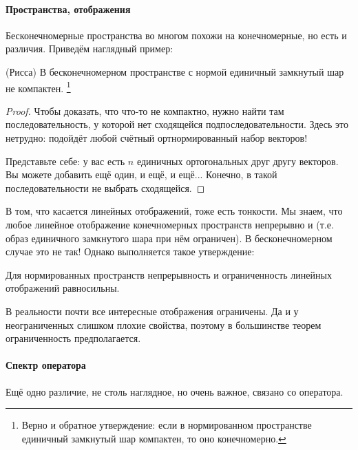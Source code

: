 \documentclass{trlnotes}
\begin{document}
    \paragraph{Пространства, отображения}
    Бесконечномерные пространства во многом похожи на конечномерные, но есть и различия. Приведём наглядный пример:

    \begin{thm}(Рисса)
        В бесконечномерном пространстве с нормой единичный замкнутый шар не компактен. \footnote{Верно и обратное утверждение: если в нормированном пространстве единичный замкнутый шар компактен, то оно конечномерно.}
        \begin{proof}
            Чтобы доказать, что что-то не компактно, нужно найти там последовательность, у которой нет сходящейся подпоследовательности. Здесь это нетрудно: подойдёт любой счётный ортнормированный набор векторов!

            Представьте себе: у вас есть $n$ единичных ортогональных друг другу векторов. Вы можете добавить ещё один, и ещё, и ещё... Конечно, в такой последовательности не выбрать сходящейся.
        \end{proof}
    \end{thm}

    В том, что касается линейных отображений, тоже есть тонкости. Мы знаем, что любое линейное отображение конечномерных пространств непрерывно и  (т.е. образ единичного замкнутого шара при нём ограничен). В бесконечномерном случае это не так! Однако выполняется такое утверждение:

    \begin{st}
        Для нормированных пространств непрерывность и ограниченность линейных отображений равносильны.
    \end{st}

    В реальности почти все интересные отображения ограничены. Да и у неограниченных слишком плохие свойства, поэтому в большинстве теорем ограниченность предполагается.

    \paragraph{Спектр оператора}

    Ещё одно различие, не столь наглядное, но очень важное, связано со  оператора.
\end{document}
